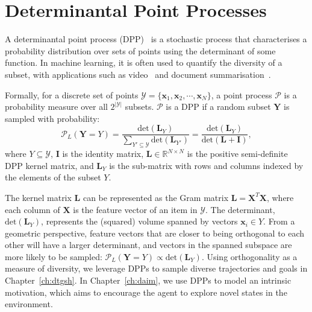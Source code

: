 \section{Determinantal Point Processes}
\label{ch3:dpp}
A determinantal point process (DPP)~\cite{kulesza2012determinantal} is a stochastic process that characterises a probability distribution over sets of points using the determinant of some function. In machine learning, it is often used to quantify the diversity of a subset, with applications such as video~\cite{mahasseni2017unsupervised} and document summarisation~\cite{hong2014improving}.

Formally, for a discrete set of points $\mathcal{Y}=\{\mathbf{x}_{1}, \mathbf{x}_{2}, \cdots, \mathbf{x}_{N}\}$, a point process $\mathcal{P}$ is a probability measure over all $2^{|\mathcal{Y}|}$ subsets. $\mathcal{P}$ is a DPP if a random subset $\mathbf{Y}$ is sampled with probability:
\begin{equation}
    \mathcal{P}_{L}(\mathbf{Y}=Y) = \frac{\text{det}(\mathbf{L}_{Y})}{\sum_{Y'\subseteq \mathcal{Y}} \text{det}(\mathbf{L}_{Y'})} = \frac{\text{det}(\mathbf{L}_{Y})}{\text{det}(\mathbf{L}+\mathbf{I})},
\end{equation}
where $Y\subseteq \mathcal{Y}$, $\mathbf{I}$ is the identity matrix, $\mathbf{L} \in \mathbb{R}^{N\times N}$ is the positive semi-definite DPP kernel matrix, and $\mathbf{L}_{Y}$ is the sub-matrix with rows and columns indexed by the elements of the subset $Y$. 

The kernel matrix $\mathbf{L}$ can be represented as the Gram matrix $\mathbf{L} = \mathbf{X}^{T}\mathbf{X}$, where each column of $\mathbf{X}$ is the feature vector of an item in $\mathcal{Y}$. The determinant, $\text{det}(\mathbf{L}_{Y})$, represents the (squared) volume spanned by vectors $\mathbf{x}_{i}\in Y$. From a geometric perspective, feature vectors that are closer to being orthogonal to each other will have a larger determinant, and vectors in the spanned subspace are more likely to be sampled: $\mathcal{P}_{L}(\mathbf{Y}=Y) \propto \text{det}(\mathbf{L}_{Y})$. Using orthogonality as a measure of diversity, we leverage DPPs to sample diverse trajectories and goals in Chapter~\ref{ch:dtgsh}. In Chapter~\ref{ch:daim}, we use DPPs to model an intrinsic motivation, which aims to encourage the agent to explore novel states in the environment.